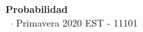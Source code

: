\documentclass[8pt,a4paper]{extarticle}
\renewcommand{\csClass}{Probabilidad}
\renewcommand{\csClassCode}{EST - 11101}
\renewcommand{\csTerm}{Primavera 2020}
\begin{document}
\begin{titlepage}
    \begin{center}
        \vspace*{1cm}
        \Huge
        \textbf{\csClass}
        \vspace{0.5cm} \\
        \Large
        \cs\ $\cdot$ \csTerm
        \vfill
        \csAuthorName
        \vspace{0.8cm}
        \csClassCode\\
        \csSchool
    \end{center}
\end{titlepage}

\begin{multicols}{3}
    \setcounter{page}{1}

    \vfill\eject
    \columnbreak
\end{multicols}
\end{document}
